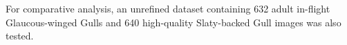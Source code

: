 \documentclass[a4paper,12pt]{report}
\begin{document}
For comparative analysis, an unrefined dataset containing 632 adult in-flight Glaucous-winged Gulls and 640 high-quality Slaty-backed Gull images was also tested.












\end{document}
